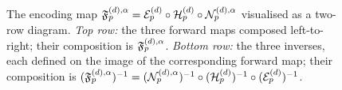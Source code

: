 \begin{figure}[!htbp]
  \centering
  
  \caption{The encoding map
  $\mathfrak{F}_p^{(d),\alpha} = \mathcal{E}_p^{(d)} \circ \mathcal{H}_p^{(d)} \circ \mathcal{N}_p^{(d),\alpha}$
  visualised as a two-row diagram. \emph{Top row:} the three forward maps
  composed left-to-right; their composition is $\mathfrak{F}_p^{(d),\alpha}$.
  \emph{Bottom row:} the three inverses, each defined on the image of
  the corresponding forward map; their composition is
  $(\mathfrak{F}_p^{(d),\alpha})^{-1} = (\mathcal{N}_p^{(d),\alpha})^{-1}
  \circ (\mathcal{H}_p^{(d)})^{-1} \circ (\mathcal{E}_p^{(d)})^{-1}$.}
  \label{fig:commutative}
\end{figure}
